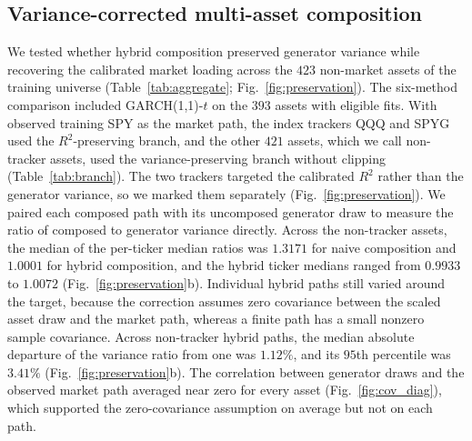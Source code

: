 
\subsection{Variance-corrected multi-asset composition}

We tested whether hybrid composition preserved generator variance
while recovering the calibrated market loading across the $423$
non-market assets of the training universe
(Table~\ref{tab:aggregate}; Fig.~\ref{fig:preservation}). The six-method
comparison included GARCH(1,1)-$t$ on the $393$ assets with eligible
fits. With observed training SPY as the market path, the index trackers QQQ
and SPYG used the $R^2$-preserving branch, and the other $421$ assets,
which we call non-tracker assets, used the variance-preserving branch
without clipping (Table~\ref{tab:branch}). The two trackers targeted
the calibrated $R^2$ rather than the generator variance, so we marked
them separately (Fig.~\ref{fig:preservation}). We paired each composed
path with its uncomposed generator draw to measure the ratio of
composed to generator variance directly. Across the non-tracker
assets, the median of the per-ticker median ratios was $1.3171$ for
naive composition and $1.0001$ for hybrid composition, and the hybrid
ticker medians ranged from $0.9933$ to $1.0072$
(Fig.~\ref{fig:preservation}b). Individual hybrid paths still varied
around the target, because the correction assumes zero covariance
between the scaled asset draw and the market path, whereas a finite
path has a small nonzero sample covariance. Across non-tracker hybrid
paths, the median absolute departure of the variance ratio from one
was $1.12\%$, and its $95$th percentile was $3.41\%$
(Fig.~\ref{fig:preservation}b). The correlation between generator
draws and the observed market path averaged near zero for every asset
(Fig.~\ref{fig:cov_diag}), which supported the zero-covariance
assumption on average but not on each path.



